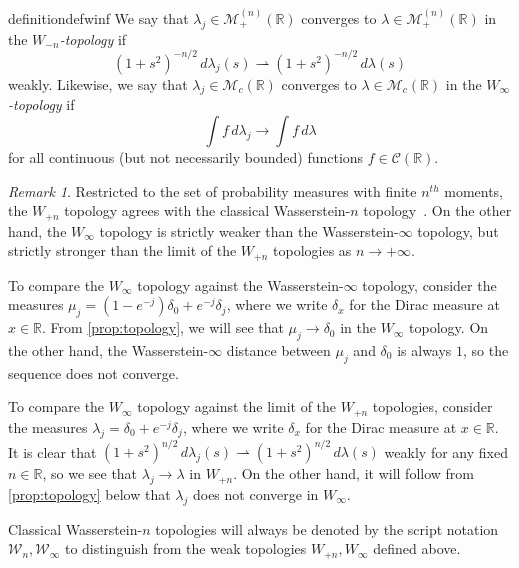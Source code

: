 \documentclass{cams-l} %
\newcommand{\RR}{\mathbb R}
\newcommand{\cM}{\mathcal M}
\newcommand{\cC}{\mathcal C}
\theoremstyle{definition}
\theoremstyle{remark}
\newtheorem{remark}[theorem]{Remark}
\numberwithin{equation}{section}
\begin{document}
\begin{restatable}{definition}{defwinf}\label{def:winf}
	We say that $\lambda_j\in\cM_+^{(n)}(\RR)$ converges to $\lambda\in\cM_+^{(n)}(\RR)$ in the \emph{$W_{-n}$-topology} if
	\[(1+s^2)^{-n/2}\,d\lambda_j(s)\rightharpoonup (1+s^2)^{-n/2}\,d\lambda(s)\]
	weakly. Likewise, we say that $\lambda_j\in\cM_c(\RR)$ converges to $\lambda\in\cM_c(\RR)$ in the \emph{$W_\infty$-topology} if
	\[\int f\,d\lambda_j\to\int f\,d\lambda\]
	for all continuous (but not necessarily bounded) functions $f\in\cC(\RR)$. 
\end{restatable}
\begin{remark}\label{rem:winf}
    Restricted to the set of probability measures with finite $n^\mathit{th}$ moments, the $W_{+n}$ topology agrees with the classical Wasserstein-$n$ topology~\cite[Ch.~5]{santambrogio2015optimal}. On the other hand, the $W_\infty$ topology is strictly weaker than the Wasserstein-$\infty$ topology, but strictly stronger than the limit of the $W_{+n}$ topologies as $n\to +\infty$.
    
    To compare the $W_\infty$ topology against the Wasserstein-$\infty$ topology, consider the measures $\mu_j = (1-e^{-j})\delta_0 + e^{-j}\delta_j$, where we write $\delta_x$ for the Dirac measure at $x\in\RR$. From \cref{prop:topology}, we will see that $\mu_j\to\delta_0$ in the $W_\infty$ topology. On the other hand, the Wasserstein-$\infty$ distance between $\mu_j$ and $\delta_0$ is always $1$, so the sequence does not converge.
    
    
    To compare the $W_\infty$ topology against the limit of the $W_{+n}$ topologies, consider the measures $\lambda_j = \delta_0 + e^{-j}\delta_j$, where we write $\delta_x$ for the Dirac measure at $x\in\RR$. It is clear that $(1+s^2)^{n/2}\,d\lambda_j(s)\rightharpoonup (1+s^2)^{n/2}\,d\lambda(s)$ weakly for any fixed $n\in\RR$, so we see that $\lambda_j\to\lambda$ in $W_{+n}$. On the other hand, it will follow from \cref{prop:topology} below that $\lambda_j$ does not converge in $W_\infty$.

    Classical Wasserstein-$n$ topologies will always be denoted by the script notation $\mathcal{W}_n, \mathcal{W}_\infty$ to distinguish from the weak topologies $W_{+n}, W_\infty$ defined above.
\end{remark}
\end{document}
